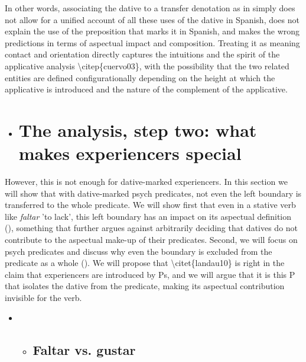 \documentclass[output=paper,modfonts,nonflat]{langsci/langscibook}
\begin{document}
In other words, associating the dative to a transfer denotation as in  simply does not allow for a unified account of all these uses of the dative in Spanish, does not explain the use of the preposition that marks it in Spanish, and makes the wrong predictions in terms of aspectual impact and composition. Treating it as meaning contact and orientation directly captures the intuitions and the spirit of the applicative analysis {\textbackslash}citep\{cuervo03\}, with the possibility that the two related entities are defined configurationally depending on the height at which the applicative is introduced and the nature of the complement of the applicative.

\begin{itemize}
\item \section{The analysis, step two: what makes experiencers special}
\end{itemize}

However, this is not enough for dative-marked experiencers. In this section we will show that with dative-marked psych predicates, not even the left boundary is transferred to the whole predicate. We will show first that even in a stative verb like \textit{faltar} 'to lack', this left boundary has an impact on its aspectual definition (), something that further argues against arbitrarily deciding that datives do not contribute to the aspectual make-up of their predicates. Second, we will focus on psych predicates and discuss why even the boundary is excluded from the predicate as a whole (). We will propose that {\textbackslash}citet\{landau10\} is right in the claim that experiencers are introduced by Ps, and we will argue that it is this P that isolates the dative from the predicate, making its aspectual contribution invisible for the verb.

\begin{itemize}
\item \begin{itemize}
\item \subsection{Faltar vs. gustar}
\end{itemize}
\end{itemize}
\end{document}
